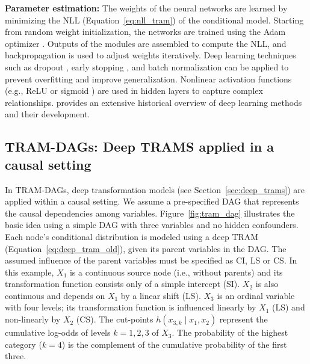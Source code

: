 %
\medskip

\textbf{Parameter estimation:} The weights of the neural networks are learned by minimizing the NLL (Equation~\ref{eq:nll_tram}) of the conditional model. Starting from random weight initialization, the networks are trained using the Adam optimizer \citep{kingma2015}. Outputs of the modules are assembled to compute the NLL, and backpropagation \citep{rumelhart1986} is used to adjust weights iteratively. Deep learning techniques such as dropout \citep{srivastava2014}, early stopping \citep{prechelt2012}, and batch normalization \citep{Ioffe2015} can be applied to prevent overfitting and improve generalization. Nonlinear activation functions (e.g., ReLU \citealp{glorot2011} or sigmoid \citealp{rumelhart1986}) are used in hidden layers to capture complex relationships. \citet{schmidhuber2015} provides an extensive historical overview of deep learning methods and their development.




\subsection{TRAM-DAGs: Deep TRAMS applied in a causal setting} \label{sec:tram_dags}



In TRAM-DAGs, deep transformation models (see Section~\ref{sec:deep_trams}) are applied within a causal setting. We assume a pre-specified DAG that represents the causal dependencies among variables. 
Figure~\ref{fig:tram_dag} illustrates the basic idea using a simple DAG with three variables and no hidden confounders. Each node's conditional distribution is modeled using a deep TRAM (Equation~\ref{eq:deep_tram_old}), given its parent variables in the DAG. The assumed influence of the parent variables must be specified as CI, LS or CS. In this example, $X_1$ is a continuous source node (i.e., without parents) and its transformation function consists only of a simple intercept (SI). $X_2$ is also continuous and depends on $X_1$ by a linear shift (LS). $X_3$ is an ordinal variable with four levels; its transformation function is influenced linearly by $X_1$ (LS) and non-linearly by $X_2$ (CS). The cut-points $h(x_{3,k} \mid x_1, x_2)$ represent the cumulative log-odds of levels $k = 1, 2, 3$ of $X_3$. The probability of the highest category ($k = 4$) is the complement of the cumulative probability of the first three.


